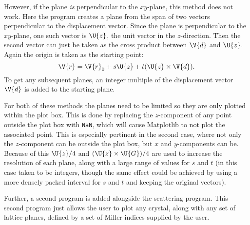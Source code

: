 \documentclass[main.tex]{subfiles}
\begin{document}
	However, if the plane \textit{is} perpendicular to the $ xy $-plane, this method does not work. Here the program creates a plane from the span of two vectors perpendicular to the displacement vector. Since the plane is perpendicular to the $ xy $-plane, one such vector is $ \U{z} $, the unit vector in the $ z $-direction. Then the second vector can just be taken as the cross product between $ \V{d} $ and $ \U{z} $. Again the origin is taken as the starting point:
	\begin{equation}
		\V{r} = \V{r}_0 + s \U{z} + t (\U{z} \times \V{d}).
	\end{equation}
	To get any subsequent planes, an integer multiple of the displacement vector $ \V{d} $ is added to the starting plane.
	
	For both of these methods the planes need to be limited so they are only plotted within the plot box. This is done by replacing the $ z $-component of any point outside the plot box with \texttt{NaN}, which will cause Matplotlib to not plot the associated point. This is especially pertinent in the second case, where not only the $ z $-component can be outside the plot box, but $ x $ and $ y $-components can be. Because of this $ \U{z}/4 $ and $ (\U{z} \times \U{G})/4 $ are used to increase the resolution of each plane, along with a large range of values for $ s $ and $ t $ (in this case taken to be integers, though the same effect could be achieved by using a more densely packed interval for $ s $ and $ t $ and keeping the original vectors).
	
	 
	Further, a second program is added alongside the scattering program. This second program just allows the user to plot any crystal, along with any set of lattice planes, defined by a set of Miller indices supplied by the user.
	
	
\end{document}
